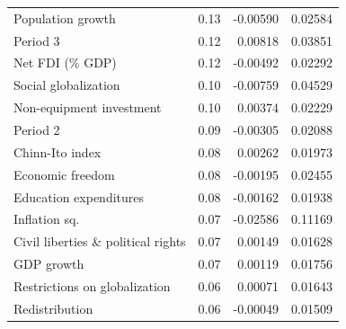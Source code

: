 \begin{refsection}
\begin{subappendices}
\begin{table}[ht!]
\begin{tabular}{lrrr}
      Population growth & 0.13 & -0.00590 & 0.02584 \\
      Period 3 & 0.12 & 0.00818 & 0.03851 \\ 
      Net FDI (\% GDP) & 0.12 & -0.00492 & 0.02292 \\
      Social globalization & 0.10 & -0.00759 & 0.04529 \\ 
      Non-equipment investment & 0.10 & 0.00374 & 0.02229 \\ 
      Period 2 & 0.09 & -0.00305 & 0.02088 \\
      Chinn-Ito index & 0.08 & 0.00262 & 0.01973 \\
      Economic freedom & 0.08 & -0.00195 & 0.02455 \\ 
      Education expenditures & 0.08 & -0.00162 & 0.01938 \\
      Inflation sq. & 0.07 & -0.02586 & 0.11169 \\
      Civil liberties \& political rights & 0.07 & 0.00149 & 0.01628 \\
      GDP growth & 0.07 & 0.00119 & 0.01756 \\
      Restrictions on globalization & 0.06 & 0.00071 & 0.01643 \\ 
      Redistribution & 0.06 & -0.00049 & 0.01509 \\
      \bottomrule
    \end{tabular}
    \end{table}


\end{subappendices}
\end{refsection}
